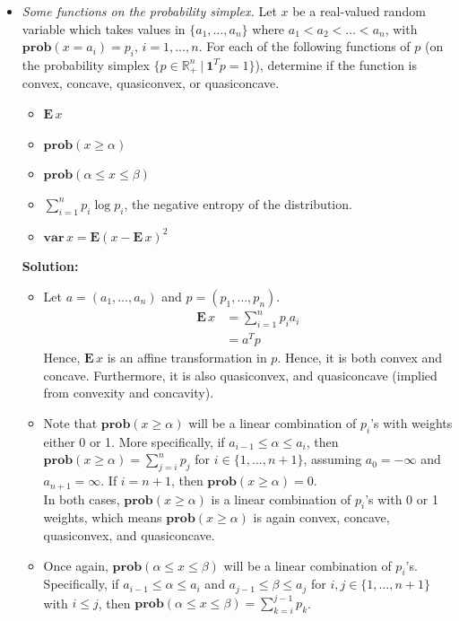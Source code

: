 \documentclass{article}
\begin{document}
\begin{itemize}
  \item[3.24] \textit{Some functions on the probability simplex.} Let $x$ be a real-valued random variable which takes values in $\{a_1, \dots, a_n\}$ where $a_1 < a_2 < \dots < a_n$, with $\mathbf{prob}(x = a_i) = p_i$, $i = 1, \dots, n$. For each of the following functions of $p$ (on the probability simplex $\{p \in \mathbb{R}_+^n ~ | ~ \mathbf{1}^Tp = 1\}$), determine if the function is convex, concave, quasiconvex, or quasiconcave.
  \begin{itemize}
    \item[(a)] $\mathbf{E}\,x$
    \item[(b)] $\mathbf{prob}(x \ge \alpha)$
    \item[(c)] $\mathbf{prob}(\alpha \le x \le \beta)$
    \item[(d)] $\sum_{i=1}^n p_i \log p_i$, the negative entropy of the distribution.
    \item[(e)] $\mathbf{var}\,x = \mathbf{E}(x - \mathbf{E}\,x)^2$
  \end{itemize}
  \textbf{Solution:}
  \begin{itemize}
    \item[(a)] Let $a = (a_1, \dots, a_n)$ and $p = (p_1, \dots, p_n)$.
    \begin{align*}
      \mathbf{E}\,x &= \sum_{i=1}^n p_i a_i \\
      &= a^T p
    \end{align*}
    Hence, $\mathbf{E}\,x$ is an affine transformation in $p$. Hence, it is both convex and concave. Furthermore, it is also quasiconvex, and quasiconcave (implied from convexity and concavity).
    \item[(b)] Note that $\mathbf{prob}(x \ge \alpha)$ will be a linear combination of $p_i$'s with weights either 0 or 1.
    More specifically, if $a_{i-1} \le \alpha \le a_i$, then $\mathbf{prob}(x \ge \alpha) = \sum_{j=i}^n p_j$ for $i \in \{1, \dots, n+1\}$, assuming $a_0 = -\infty$ and $a_{n+1} = \infty$. If $i = n + 1$, then $\mathbf{prob}(x \ge \alpha) = 0$. \\
    In both cases, $\mathbf{prob}(x \ge \alpha)$ is a linear combination of $p_i$'s with 0 or 1 weights, which means $\mathbf{prob}(x \ge \alpha)$ is again convex, concave, quasiconvex, and quasiconcave.
    \item[(c)] Once again, $\mathbf{prob}(\alpha \le x \le \beta)$ will be a linear combination of $p_i$'s. Specifically, if $a_{i-1} \le \alpha \le a_i$ and $a_{j-1} \le \beta \le a_j$ for $i, j \in \{1, \dots, n+1\}$ with $i \le j$, then $\mathbf{prob}(\alpha \le x \le \beta) = \sum_{k=i}^{j-1} p_k$.

\end{itemize}
\end{itemize}
\end{document}

